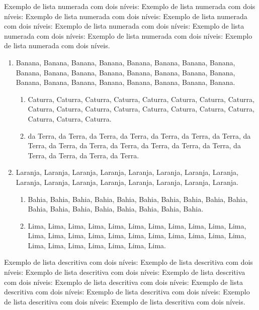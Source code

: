 Exemplo de lista numerada com dois níveis: Exemplo de lista numerada com dois níveis: Exemplo de lista numerada com dois níveis: Exemplo de lista numerada com dois níveis: Exemplo de lista numerada com dois níveis: Exemplo de lista numerada com dois níveis: Exemplo de lista numerada com dois níveis: Exemplo de lista numerada com dois níveis.

\begin{enumerate}

\item Banana, Banana, Banana, Banana, Banana, Banana, Banana, Banana, Banana, Banana, Banana, Banana, Banana, Banana, Banana, Banana, Banana, Banana, Banana, Banana, Banana, Banana, Banana, Banana.

\begin{enumerate}

\item Caturra, Caturra, Caturra, Caturra, Caturra, Caturra, Caturra, Caturra, Caturra, Caturra, Caturra, Caturra, Caturra, Caturra, Caturra, Caturra, Caturra, Caturra, Caturra.

\item da Terra, da Terra, da Terra, da Terra, da Terra, da Terra, da Terra, da Terra, da Terra, da Terra, da Terra, da Terra, da Terra, da Terra, da Terra, da Terra, da Terra, da Terra.

\end{enumerate}

\item Laranja, Laranja, Laranja, Laranja, Laranja, Laranja, Laranja, Laranja, Laranja, Laranja, Laranja, Laranja, Laranja, Laranja, Laranja, Laranja.

\begin{enumerate}

\item Bahia, Bahia, Bahia, Bahia, Bahia, Bahia, Bahia, Bahia, Bahia, Bahia, Bahia, Bahia, Bahia, Bahia, Bahia, Bahia, Bahia, Bahia.

\item Lima, Lima, Lima, Lima, Lima, Lima, Lima, Lima, Lima, Lima, Lima, Lima, Lima, Lima, Lima, Lima, Lima, Lima, Lima, Lima, Lima, Lima, Lima, Lima, Lima, Lima, Lima, Lima, Lima.

\end{enumerate}

\end{enumerate}

Exemplo de lista descritiva com dois níveis: Exemplo de lista descritiva com dois níveis: Exemplo de lista descritiva com dois níveis: Exemplo de lista descritiva com dois níveis: Exemplo de lista descritiva com dois níveis: Exemplo de lista descritiva com dois níveis: Exemplo de lista descritiva com dois níveis: Exemplo de lista descritiva com dois níveis: Exemplo de lista descritiva com dois níveis.

